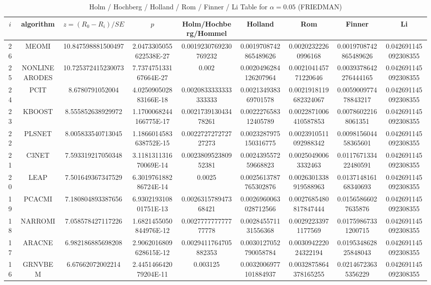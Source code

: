 \documentclass[a4paper,10pt]{article}
\begin{document}
\begin{landscape}
\begin{table}[!htp]
\begin{tabular}{
|r|r|r|r|r|r|r|r|r|r|r|r|r|r|r|r|r|r|r|r|r|r|r|r|r|r|r|r|}
\end{tabular}
\end{table}

\newpage

\begin{table}[!htp]
\centering\scriptsize
\caption{Holm / Hochberg / Holland / Rom / Finner / Li Table for $\alpha=0.05$ (FRIEDMAN)}
\begin{tabular}{ccccccccc}
$i$&algorithm&$z=(R_0 - R_i)/SE$&$p$&Holm/Hochberg/Hommel&Holland&Rom&Finner&Li\\
\hline
26&MEOMI&10.847598881500497&2.0473305055622538E-27&0.0019230769230769232&0.0019708742865489626&0.00202322260996168&0.0019708742865489626&0.042691145092308355\\
25&NONLINEARODES&10.725372415230073&7.737475133167664E-27&0.002&0.0020496284126207964&0.002104145771220646&0.0039378642276444165&0.042691145092308355\\
24&PCIT&8.6780791052004&4.025090502883166E-18&0.0020833333333333333&0.002134938369701578&0.0021918119682324067&0.005900977478843217&0.042691145092308355\\
23&KBOOST&8.555852638929972&1.1700068244166775E-17&0.002173913043478261&0.002227658312405789&0.0022871006410587853&0.00786022168061351&0.042691145092308355\\
22&PLSNET&8.005833540713045&1.1866014583638752E-15&0.002272727272727273&0.0023287975150316775&0.0023910511092988342&0.009815604458365601&0.042691145092308355\\
21&C3NET&7.593319217050348&3.118131131670069E-14&0.002380952380952381&0.002439557259668823&0.00250490063332463&0.011767133422480591&0.042691145092308355\\
20&LEAP&7.501649367347529&6.301976188286724E-14&0.0025&0.0025613787765302876&0.0026301338919588963&0.013714816168340693&0.042691145092308355\\
19&PCACMI&7.180804893387656&6.930219310801751E-13&0.002631578947368421&0.0026960063028712566&0.0027685480817847444&0.01565866027635876&0.042691145092308355\\
18&NARROMI&7.058578427117226&1.6821455050844976E-12&0.002777777777777778&0.002845571131556368&0.00292233971177569&0.01759867331200715&0.042691145092308355\\
17&ARACNE&6.982186885698208&2.9062016809628615E-12&0.0029411764705882353&0.0030127052790058784&0.003094222024322194&0.019534862825848043&0.042691145092308355\\
16&GRNVBEM&6.67662072002214&2.445146642079204E-11&0.003125&0.0032006977101884937&0.0032875864378165255&0.02146723635356229&0.042691145092308355\\

\end{tabular}
\end{table}
\end{landscape}
\end{document}
